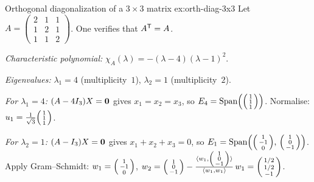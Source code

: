 \begin{example}{Orthogonal diagonalization of a $3\times 3$ matrix}%
{ex:orth-diag-3x3}
Let
$A = \begin{pmatrix} 2 & 1 & 1 \\ 1 & 2 & 1 \\ 1 & 1 & 2 \end{pmatrix}$.
One verifies that ${A}^{\mathsf{T}}=A$.

\emph{Characteristic polynomial:}
$\chi_A(\lambda) = -(\lambda-4)(\lambda-1)^2$.

\emph{Eigenvalues:} $\lambda_1=4$ (multiplicity~$1$),
$\lambda_2=1$ (multiplicity~$2$).

\emph{For $\lambda_1=4$:}
$(A-4I_3)X=\mathbf{0}$ gives $x_1=x_2=x_3$, so
$E_4 = \operatorname{Span}\!\left(\begin{psmallmatrix}1\\1\\1\end{psmallmatrix}\right)$.
Normalise: $u_1 = \frac{1}{\sqrt{3}}\begin{psmallmatrix}1\\1\\1\end{psmallmatrix}$.

\emph{For $\lambda_2=1$:}
$(A-I_3)X=\mathbf{0}$ gives $x_1+x_2+x_3=0$, so
$E_1 = \operatorname{Span}\!\left(
  \begin{psmallmatrix}1\\-1\\0\end{psmallmatrix},\,
  \begin{psmallmatrix}1\\0\\-1\end{psmallmatrix}
\right)$.
Apply Gram--Schmidt:
$w_1 = \begin{psmallmatrix}1\\-1\\0\end{psmallmatrix}$,
$w_2 = \begin{psmallmatrix}1\\0\\-1\end{psmallmatrix}
  - \frac{\langle w_1,\begin{psmallmatrix}1\\0\\-1\end{psmallmatrix}\rangle}{\langle w_1,w_1\rangle}\,w_1
= \begin{psmallmatrix}1/2\\1/2\\-1\end{psmallmatrix}$.


\end{example}
